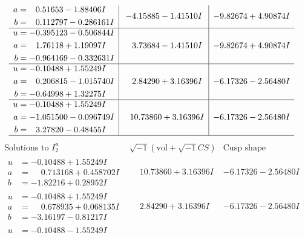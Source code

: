 \documentclass[1p]{elsarticle_modified}
\theoremstyle{definition}
\newcommand{\I}{\sqrt{-1}}
\begin{document}
$$\begin{array}{c|c|c}
\begin{aligned}
a &= \phantom{-}0.51653 - 1.88406 I \\
b &= \phantom{-}0.112797 - 0.286161 I\end{aligned}
 & -4.15885 - 1.41510 I & -9.82674 + 4.90874 I \\ \hline\begin{aligned}
u &= -0.395123 - 0.506844 I \\
a &= \phantom{-}1.76118 + 1.19097 I \\
b &= -0.964169 - 0.332631 I\end{aligned}
 & \phantom{-}3.73684 - 1.41510 I & -9.82674 + 4.90874 I \\ \hline\begin{aligned}
u &= -0.10488 + 1.55249 I \\
a &= \phantom{-}0.206815 - 1.015740 I \\
b &= -0.64998 + 1.32275 I\end{aligned}
 & \phantom{-}2.84290 + 3.16396 I & -6.17326 - 2.56480 I \\ \hline\begin{aligned}
u &= -0.10488 + 1.55249 I \\
a &= -1.051500 - 0.096749 I \\
b &= \phantom{-}3.27820 - 0.48455 I\end{aligned}
 & \phantom{-}10.73860 + 3.16396 I & -6.17326 - 2.56480 I\\
 \hline 
 \end{array}$$\newpage$$\begin{array}{c|c|c}  
\text{Solutions to }I^u_{2}& \I (\text{vol} + \sqrt{-1}CS) & \text{Cusp shape}\\
 \hline 
\begin{aligned}
u &= -0.10488 + 1.55249 I \\
a &= \phantom{-}0.713168 + 0.458702 I \\
b &= -1.82216 + 0.28952 I\end{aligned}
 & \phantom{-}10.73860 + 3.16396 I & -6.17326 - 2.56480 I \\ \hline\begin{aligned}
u &= -0.10488 + 1.55249 I \\
a &= \phantom{-}0.678935 + 0.068135 I \\
b &= -3.16197 - 0.81217 I\end{aligned}
 & \phantom{-}2.84290 + 3.16396 I & -6.17326 - 2.56480 I \\ \hline\begin{aligned}
u &= -0.10488 - 1.55249 I \\

\end{aligned}
\end{array}$$
\end{document}
